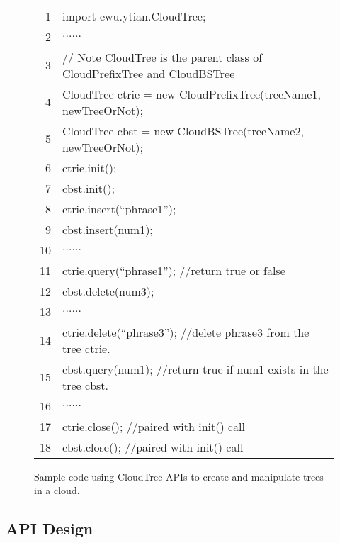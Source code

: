 \documentclass[10pt, conference, compsocconf]{IEEEtran}
\begin{document}
\begin{figure}
\begin{center}
{\tiny \tt 
\begin{tabular}{rl}
1 & import ewu.ytian.CloudTree;\\
2 & $\ldots \ldots$\\
3 & // Note CloudTree is the parent class of CloudPrefixTree and
CloudBSTree\\
4 & CloudTree ctrie = new CloudPrefixTree(treeName1, newTreeOrNot);\\5 & CloudTree cbst = new CloudBSTree(treeName2, newTreeOrNot);\\6 & ctrie.init();\\
7 & cbst.init();\\
8 & ctrie.insert(``phrase1'');\\
9 & cbst.insert(num1);\\
10 & $\ldots \ldots$\\
11 & ctrie.query(``phrase1''); //return true or false\\
12 & cbst.delete(num3);\\
13 & $\ldots \ldots$\\
14 & ctrie.delete(``phrase3''); //delete phrase3 from the tree ctrie.\\
15 & cbst.query(num1); //return true if num1 exists in the tree
cbst.\\
16 & $\ldots \ldots$\\
17 & ctrie.close(); //paired with init() call \\
18 & cbst.close(); //paired with init() call\\
\end{tabular}
}
\caption{Sample code using CloudTree APIs to create and manipulate trees in a cloud. }
\label{fig:usecase}
\end{center}
\end{figure}




\subsection{API Design}
\end{document}
